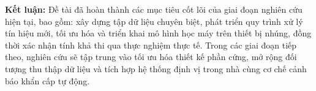 \textbf{Kết luận:} Đề tài đã hoàn thành các mục tiêu cốt lõi của giai đoạn nghiên cứu hiện tại, bao gồm: xây dựng tập dữ liệu chuyên biệt, phát triển quy trình xử lý tín hiệu mới, tối ưu hóa và triển khai mô hình học máy trên thiết bị nhúng, đồng thời xác nhận tính khả thi qua thực nghiệm thực tế. Trong các giai đoạn tiếp theo, nghiên cứu sẽ tập trung vào tối ưu hóa thiết kế phần cứng, mở rộng đối tượng thu thập dữ liệu và tích hợp hệ thống định vị trong nhà cùng cơ chế cảnh báo khẩn cấp tự động.